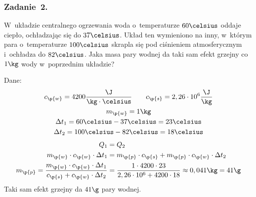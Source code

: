 \subsubsection*{Zadanie~2.}
\begin{statement}
    W~układzie centralnego ogrzewania woda o~temperaturze \(60\celsius\) oddaje ciepło, ochładzając się do \(37\celsius\). Układ ten wymieniono na inny, w~którym para o~temperaturze \(100\celsius\) skrapla się pod ciśnieniem atmosferycznym i~ochładza do \(82\celsius\). Jaka masa pary wodnej da taki sam efekt grzejny co \(1\kg\) wody w~poprzednim układzie?
\end{statement}
Dane:
\begin{gather*}
    c_\p{w} = 4200\frac{\J}{\kg \cdot \celsius} \qquad c_\p{s} = 2,26 \cdot 10^6 \frac{\J}{\kg}\\
    m_\p{w} = 1\kg\\
    \Delta t_1 = 60\celsius - 37\celsius = 23\celsius\\
    \Delta t_2 = 100\celsius - 82\celsius = 18\celsius
\end{gather*}
\begin{align*}
    Q_1 &= Q_2\\
    m_\p{w} \cdot c_\p{w} \cdot \Delta t_1 &= m_\p{p} \cdot c_\p{s} + m_\p{p} \cdot c_\p{w} \cdot \Delta t_2\\
    m_\p{p} = \frac{m_\p{w} \cdot c_\p{w} \cdot \Delta t_1}{c_\p{s} + c_\p{w} \cdot \Delta t_2}
        &= \frac{1 \cdot 4200 \cdot 23}{2,26 \cdot 10^6 + 4200 \cdot 18}
        \approx 0,041\kg
        = 41\g
\end{align*}
Taki sam efekt grzejny da \(41\g\) pary wodnej.
